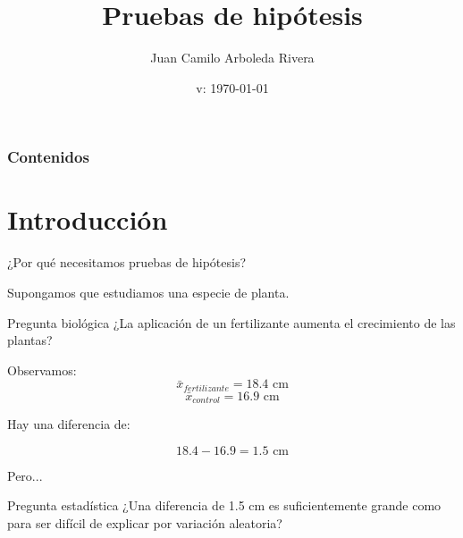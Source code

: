 \documentclass[11pt, aspectratio=169]{beamer}
\begin{document}
\author[Juan C. Arboleda Rivera]{Juan Camilo Arboleda Rivera}
\title{Pruebas de hipótesis}
\date{v: \today}

\begin{frame}[plain]
  \maketitle
\end{frame}

\begin{frame}
 \frametitle{Contenidos}
 \tableofcontents
\end{frame}

\section{Introducción}

\begin{frame}{¿Por qué necesitamos pruebas de hipótesis?}

Supongamos que estudiamos una especie de planta.

\begin{block}{Pregunta biológica}
¿La aplicación de un fertilizante aumenta el crecimiento de las plantas?
\end{block}

Observamos:
\vspace{-1em}
\[
\bar{x}_{fertilizante}=18.4\text{ cm}
\]
\vspace{-1em}
\[
\bar{x}_{control}=16.9\text{ cm}
\]

Hay una diferencia de:

\[
18.4-16.9=1.5\text{ cm}
\]

\pause

Pero...

\begin{alertblock}{Pregunta estadística}
¿Una diferencia de 1.5 cm es suficientemente grande como para ser difícil
de explicar por variación aleatoria?
\end{alertblock}

\end{frame}
\end{document}

